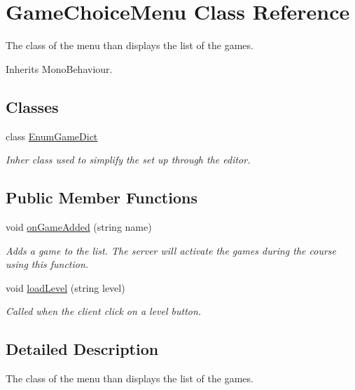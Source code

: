 \hypertarget{class_game_choice_menu}{\section{Game\-Choice\-Menu Class Reference}
\label{class_game_choice_menu}
}


The class of the menu than displays the list of the games. 




Inherits Mono\-Behaviour.

\subsection*{Classes}
\begin{DoxyCompactItemize}
\item 
class \hyperlink{class_game_choice_menu_1_1_enum_game_dict}{Enum\-Game\-Dict}
\begin{DoxyCompactList}\small\item\em Inher class used to simplify the set up through the editor.\end{DoxyCompactList}\end{DoxyCompactItemize}
\subsection*{Public Member Functions}
\begin{DoxyCompactItemize}
\item 
void \hyperlink{class_game_choice_menu_a3bf414ccb947a7eb8b356ae6b409d545}{on\-Game\-Added} (string name)
\begin{DoxyCompactList}\small\item\em Adds a game to the list. The server will activate the games during the course using this function.\end{DoxyCompactList}\item 
void \hyperlink{class_game_choice_menu_acbe750dbd6a26924153257f3c9390f1f}{load\-Level} (string level)
\begin{DoxyCompactList}\small\item\em Called when the client click on a level button.\end{DoxyCompactList}\end{DoxyCompactItemize}


\subsection{Detailed Description}
The class of the menu than displays the list of the games.



